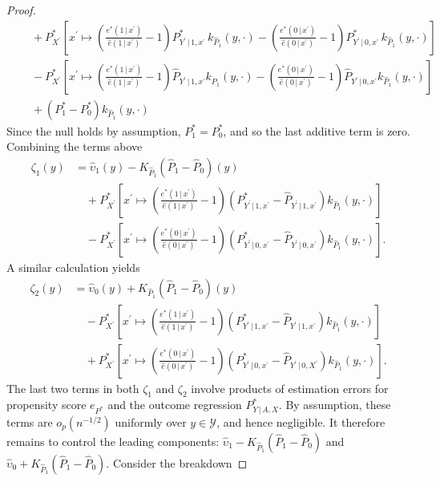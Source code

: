 \documentclass{article}
\theoremstyle{plain}
\theoremstyle{definition}
\theoremstyle{remark}
\newcommand{\of}[1]{\left(#1\right)}
\newcommand{\off}[1]{\left[#1\right]}
\newcommand{\cY}{\mathcal{Y}}
\newcommand{\wh}[1]{\widehat{#1}}
\newcommand{\hP}{\widehat{P}}
\newcommand{\1}{\mathbbm{1}}
\theoremstyle{plain}
\theoremstyle{definition}
\newcommand{\mymid}{\,|\,}
\begin{document}
\begin{proof}
\begin{align*}
        &\quad +  P^*_{X^\prime} \off{x^\prime \mapsto \of{\frac{e^*(1 \mymid x^\prime)}{\hat{e}(1 \mymid x^\prime)}-1} P^*_{Y^\prime \mymid 1, x^\prime}\, k_{\hP_1}(y, \cdot) - \of{\frac{e^*(0 \mymid x^\prime)}{\hat{e}(0 \mymid x^\prime)}-1} P^*_{Y^\prime \mymid 0, x^\prime} \, k_{\hP_1}(y, \cdot)} \\
        &\quad -  P^*_{X^\prime} \off{x^\prime \mapsto \of{\frac{e^*(1 \mymid x^\prime)}{\hat{e}(1 \mymid x^\prime)}-1} \hP_{Y^\prime \mymid 1, x^\prime} k_{\hP_1}(y, \cdot) - \of{\frac{e^*(0 \mymid x^\prime)}{\hat{e}(0 \mymid x^\prime)}-1} \hP_{Y^\prime \mymid 0, x^\prime} k_{\hP_1}(y, \cdot)} \\
        & \quad + (P_1^* - P_0^*) k_{\hP_1}(y, \cdot)
    \end{align*}
    Since the null holds by assumption, $P_1^* = P_0^*$, and so the last additive term is zero. Combining the terms above
    \begin{align*}
        \zeta_1(y) &=  \wh{\upsilon}_1(y) - K_{\hP_1} (\hP_1 - \hP_0) (y) \\
        & \quad + P^*_{X^\prime} \off{x^\prime \mapsto \of{\frac{e^*(1 \mymid x^\prime)}{\hat{e}(1 \mymid x^\prime)}-1} \of{P^*_{Y^\prime \mymid 1, x^\prime} - \hP_{Y^\prime \mymid 1, x^\prime}} k_{\hP_1}(y, \cdot)}\\
        & \quad -  P^*_{X^\prime} \off{x^\prime \mapsto \of{\frac{e^*(0 \mymid x^\prime)}{\hat{e}(0 \mymid x^\prime)}-1} \of{P^*_{Y^\prime \mymid 0, x^\prime} - \hP_{Y^\prime \mymid 0, x^\prime}} k_{\hP_1}(y, \cdot)}.
    \end{align*}
    A similar calculation yields
    \begin{align*}
        \zeta_2(y) &=  \wh{\upsilon}_0(y) + K_{\hP_1}(\hP_{1} - \hP_{0}) (y) \\
        & \quad - P^*_{X^\prime} \off{x^\prime \mapsto \of{\frac{e^*(1 \mymid x^\prime)}{\hat{e}(1 \mymid x^\prime)}-1} \of{P^*_{Y^\prime \mymid 1, x^\prime} - \hP_{Y^\prime \mymid 1, x^\prime}} k_{\hP_1}(y, \cdot)}\\
        & \quad +  P^*_{X^\prime} \off{x^\prime \mapsto \of{\frac{e^*(0 \mymid x^\prime)}{\hat{e}(0 \mymid x^\prime)}-1} \of{P^*_{Y^\prime \mymid 0, x^\prime} - \hP_{Y^\prime \mymid 0, X^\prime}} k_{\hP_1}(y, \cdot)}.
    \end{align*}
    The last two terms in both $\zeta_1$ and $\zeta_2$ involve products of estimation errors for propensity score $e_{P^*}$ and the outcome regression $P^*_{Y \mymid A, X}$. By assumption, these terms are $o_p(n^{-1/2})$ uniformly over $y \in \cY$, and hence negligible. It therefore remains to control the leading components: $ \wh{\upsilon}_1 - K_{\hP_1} (\hP_1 - \hP_0)$ and $ \wh{\upsilon}_0 + K_{\hP_1} (\hP_1 - \hP_0)$. Consider the breakdown

\end{proof}
\end{document}

